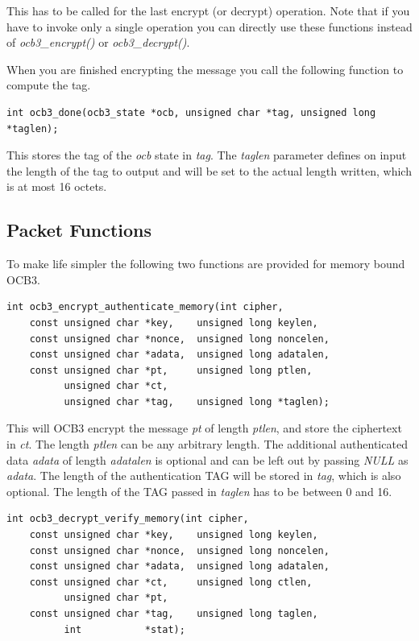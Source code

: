 \documentclass[synpaper]{book}
\begin{document}
This has to be called for the last encrypt (or decrypt) operation. Note that if you have to invoke only a single operation you can
directly use these functions instead of \textit{ocb3\_encrypt()} or \textit{ocb3\_decrypt()}.

When you are finished encrypting the message you call the following function to compute the tag.

\begin{verbatim}
int ocb3_done(ocb3_state *ocb, unsigned char *tag, unsigned long *taglen);
\end{verbatim}

This stores the tag of the \textit{ocb} state in \textit{tag}.
The \textit{taglen} parameter defines on input the length of the tag to output and will be set to the actual length written, which
is at most 16 octets.

\subsection{Packet Functions}
To make life simpler the following two functions are provided for memory bound OCB3.

\begin{verbatim}
int ocb3_encrypt_authenticate_memory(int cipher,
    const unsigned char *key,    unsigned long keylen,
    const unsigned char *nonce,  unsigned long noncelen,
    const unsigned char *adata,  unsigned long adatalen,
    const unsigned char *pt,     unsigned long ptlen,
          unsigned char *ct,
          unsigned char *tag,    unsigned long *taglen);
\end{verbatim}

This will OCB3 encrypt the message \textit{pt} of length \textit{ptlen}, and store the ciphertext in \textit{ct}.  The length \textit{ptlen}
can be any arbitrary length.  The additional authenticated data \textit{adata} of length \textit{adatalen} is optional and can be left out
by passing \textit{NULL} as \textit{adata}. The length of the authentication TAG will be stored in \textit{tag}, which is also optional.
The length of the TAG passed in \textit{taglen} has to be between 0 and 16.

\begin{verbatim}
int ocb3_decrypt_verify_memory(int cipher,
    const unsigned char *key,    unsigned long keylen,
    const unsigned char *nonce,  unsigned long noncelen,
    const unsigned char *adata,  unsigned long adatalen,
    const unsigned char *ct,     unsigned long ctlen,
          unsigned char *pt,
    const unsigned char *tag,    unsigned long taglen,
          int           *stat);
\end{verbatim}
\end{document}
